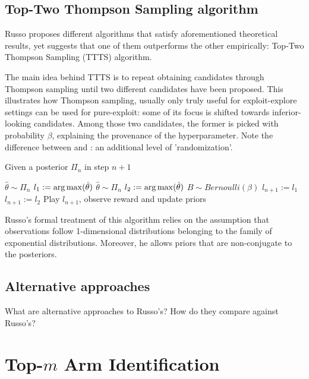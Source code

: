 \subsection{Top-Two Thompson Sampling algorithm}

Russo proposes different algorithms that satisfy aforementioned theoretical results, yet suggests that one of them outperforms the other empirically: Top-Two Thompson Sampling (TTTS) algorithm.

The main idea behind TTTS is to repeat obtaining candidates through Thompson sampling until two different candidates have been proposed. This illustrates how Thompson sampling, usually only truly useful for exploit-explore settings can be used for pure-exploit: some of its focus is shifted towards inferior-looking candidates. Among those two candidates, the former is picked with probability $\beta$, explaining the provenance of the hyperparameter. Note the difference between  and : an additional level of 'randomization'.

\begin{algorithm}[H]
    \caption{Given a posterior $\Pi_n$ in step $n + 1$}
    \label{alg:TTTS}
  \begin{algorithmic}
    \State $\hat{\theta} \sim \Pi_n$
    \State $l_1 := \operatorname*{arg\,max}(\hat{\theta})$
    \Repeat
      \State $\hat{\theta} \sim \Pi_n$
      \State $l_2 := \operatorname*{arg\,max}(\hat{\theta})$
    \State $B \sim Bernoulli(\beta)$
      \State $l_{n+1} := l_1$
    \Else
      \State $l_{n+1} := l_2$
    \EndIf
    \State Play $l_{n+1}$, observe reward and update priors
  \end{algorithmic}
\end{algorithm}

Russo's formal treatment of this algorithm relies on the assumption that observations follow 1-dimensional distributions belonging to the family of exponential distributions. Moreover, he allows priors that are non-conjugate to the posteriors.

\subsection{Alternative approaches}
What are alternative approaches to Russo's?
How do they compare against Russo's?

\section{Top-$m$ Arm Identification}

